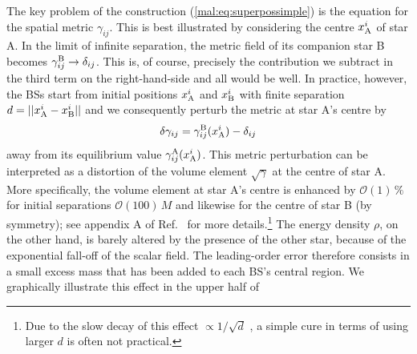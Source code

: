 The key problem of the construction (\ref{mal:eq:superpossimple})
is the equation for the spatial metric $\gamma_{ij}$. This is best
illustrated by considering the centre $x_{\rm A}^i$ of star A.
In the limit of infinite separation, the metric field of its
companion star B becomes $\gamma_{ij}^{\rm B}\rightarrow \delta_{ij}$.
This is, of course, precisely the contribution we subtract in
the third term on the right-hand-side and all would be well.
In practice, however, the BSs start from initial positions
$x_{\rm A}^i$ and $x_{\rm B}^i$ with finite separation
$d=||x_{\rm A}^i-x_{\rm B}^i||$ and we consequently perturb
the metric at star A's centre by
%
\begin{equation}
  \delta \gamma_{ij} = \gamma_{ij}^{\rm B}(x^i_{\rm A})
  -\delta_{ij}
  \label{mal:eq:metricpert}
\end{equation}
%
away from its equilibrium value $\gamma_{ij}^{\rm A}(x_{\rm A}^i)$.
This metric perturbation can be interpreted as a distortion of
the volume element $\sqrt{\gamma}$
at the centre of star A. More specifically, the volume element
at star A's centre is enhanced by $\mathcal{O}(1)\,\%$ for initial
separations $\mathcal{O}(100)\,M$ and likewise for the centre of
star B (by symmetry); see appendix A of Ref.~\cite{Helfer:2018vtq}
for more details.\footnote{Due to the slow decay of this effect $\propto 1/\sqrt{d}$ \cite{Helfer:2018vtq},
a simple cure in terms of using larger $d$ is often not practical.}
The energy density $\rho$, on the other hand, is barely altered by the
presence of the other star, because of the exponential fall-off of
the scalar field. The leading-order error therefore consists in a
small excess mass that has been added to each BS's central region.
We graphically illustrate this effect in the upper half of
%
